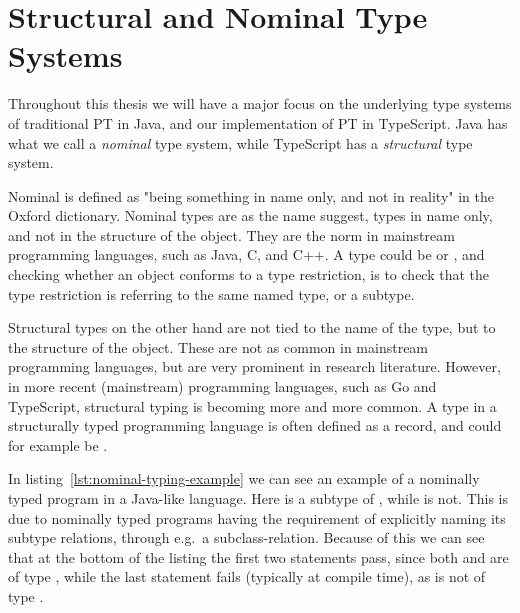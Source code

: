 \section{Structural and Nominal Type Systems}\label{sec:structural-and-nominal-type-systems}

Throughout this thesis we will have a major focus on the underlying type systems of traditional PT in Java, and our implementation of PT in TypeScript.
Java has what we call a \emph{nominal} type system, while TypeScript has a \emph{structural} type system.

Nominal is defined as "being something in name only, and not in reality" in the Oxford dictionary.
Nominal types are as the name suggest, types in name only, and not in the structure of the object.
They are the norm in mainstream programming languages, such as Java, C, and C++.
A type could be  or , and checking whether an object conforms to a type restriction, is to check that the type restriction is referring to the same named type, or a subtype.

Structural types on the other hand are not tied to the name of the type, but to the structure of the object.
These are not as common in mainstream programming languages, but are very prominent in research literature.
However, in more recent (mainstream) programming languages, such as Go and TypeScript, structural typing is becoming more and more common.
A type in a structurally typed programming language is often defined as a record, and could for example be .

In listing~\vref{lst:nominal-typing-example} we can see an example of a nominally typed program in a Java-like language.
Here  is a subtype of , while  is not.
This is due to nominally typed programs having the requirement of explicitly naming its subtype relations, through e.g.\ a subclass-relation.
Because of this we can see that at the bottom of the listing the first two statements pass, since both  and  are of type , while the last statement fails (typically at compile time), as  is not of type .


